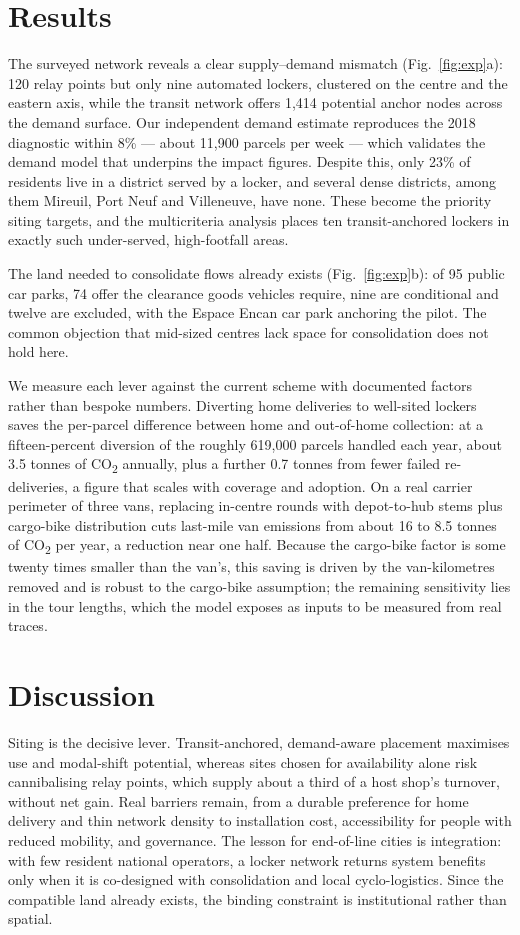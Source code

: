 \documentclass[3p,times]{elsarticle}
\begin{document}
\section{Results}
The surveyed network reveals a clear supply--demand mismatch (Fig.~\ref{fig:exp}a):
120 relay points but only nine automated lockers, clustered on the centre and the
eastern axis, while the transit network offers 1{,}414 potential anchor nodes
across the demand surface. Our independent demand estimate reproduces the 2018
diagnostic within 8\% --- about 11{,}900 parcels per week --- which validates the
demand model that underpins the impact figures. Despite this, only 23\% of
residents live in a district served by a locker, and several dense districts, among
them Mireuil, Port Neuf and Villeneuve, have none. These become the priority siting
targets, and the multicriteria analysis places ten transit-anchored lockers in
exactly such under-served, high-footfall areas.

The land needed to consolidate flows already exists (Fig.~\ref{fig:exp}b): of 95
public car parks, 74 offer the clearance goods vehicles require, nine are
conditional and twelve are excluded, with the Espace Encan car park anchoring the
pilot. The common objection that mid-sized centres lack space for consolidation
does not hold here.

We measure each lever against the current scheme with documented factors rather
than bespoke numbers. Diverting home deliveries to well-sited lockers saves the
per-parcel difference between home and out-of-home collection: at a fifteen-percent
diversion of the roughly 619,000 parcels handled each year, about 3.5 tonnes of
CO\textsubscript{2} annually, plus a further 0.7 tonnes from fewer failed
re-deliveries, a figure that scales with coverage and adoption. On a real carrier
perimeter of three vans, replacing in-centre rounds with depot-to-hub stems plus
cargo-bike distribution cuts last-mile van emissions from about 16 to 8.5 tonnes of
CO\textsubscript{2} per year, a reduction near one half. Because the cargo-bike
factor is some twenty times smaller than the van's, this saving is driven by the
van-kilometres removed and is robust to the cargo-bike assumption; the remaining
sensitivity lies in the tour lengths, which the model exposes as inputs to be
measured from real traces.

\section{Discussion}
Siting is the decisive lever. Transit-anchored, demand-aware placement maximises
use and modal-shift potential, whereas sites chosen for availability alone risk
cannibalising relay points, which supply about a third of a host shop's turnover,
without net gain. Real barriers remain, from a durable preference for home delivery
and thin network density to installation cost, accessibility for people with
reduced mobility, and governance. The lesson for end-of-line cities is integration:
with few resident national operators, a locker network returns system benefits only
when it is co-designed with consolidation and local cyclo-logistics. Since the
compatible land already exists, the binding constraint is institutional rather than
spatial.
\end{document}
